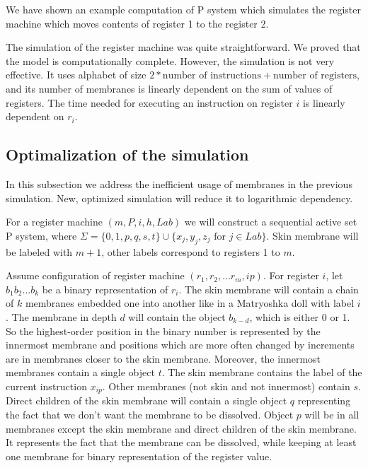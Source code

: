 \documentclass[submission,copyright,creativecommons]{../lib/lncs/llncs}
\begin{document}
\begin{example}
  We have shown an example computation of P system which simulates the register machine which moves contents of register 1 to the register 2.
\end{example}

The simulation of the register machine was quite straightforward. We proved that the model is computationally complete. However, the simulation is not very effective. It uses alphabet of size $2 * \text{number of instructions} + \text{number of registers}$, and its number of membranes is linearly dependent on the sum of values of registers. The time needed for executing an instruction on register $i$ is linearly dependent on $r_i$.


\subsection{Optimalization of the simulation} %
\label{sub:optimalization_of_the_simulation}

In this subsection we address the inefficient usage of membranes in the previous simulation. New, optimized simulation will reduce it to logarithmic dependency.

For a register machine $(m,P,i,h,Lab)$ we will construct a sequential active set P system, where $\Sigma = \{0,1,p,q,s,t\}\cup\{x_j, y_j, z_j \text{~for~} j\in Lab\}$. Skin membrane will be labeled with $m+1$, other labels correspond to registers 1 to $m$.

Assume configuration of register machine $(r_1, r_2, \ldots r_m, ip)$. For register $i$, let $b_1b_2\ldots b_k$ be a binary representation of $r_i$. The skin membrane will contain a chain of $k$ membranes embedded one into another like in a Matryoshka doll with label $i$.
The membrane in depth $d$ will contain the object $b_{k-d}$, which is either 0 or 1. So the highest-order position in the binary number is represented by the innermost membrane and positions which are more often changed by increments are in membranes closer to the skin membrane. Moreover, the innermost membranes contain a single object $t$. The skin membrane contains the label of the current instruction $x_{ip}$. Other membranes (not skin and not innermost) contain $s$. Direct children of the skin membrane will contain a single object $q$ representing the fact that we don't want the membrane to be dissolved. Object $p$ will be in all membranes except the skin membrane and direct children of the skin membrane. It represents the fact that the membrane can be dissolved, while keeping at least one membrane for binary representation of the register value.
\end{document}
